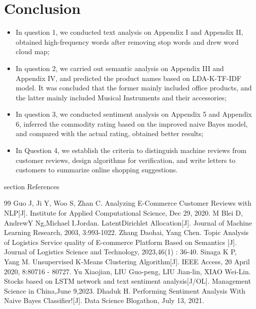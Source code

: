\documentclass[12pt]{mcmthesis}
\begin{document}
\section{Conclusion}
\begin{itemize}
	\item In question 1, we conducted text analysis on Appendix I and Appendix II, obtained high-frequency words after removing stop words and drew word cloud map;
	\item In question 2, we carried out semantic analysis on Appendix III and Appendix IV, and predicted the product names based on LDA-K-TF-IDF model. It was concluded that the former mainly included office products, and the latter mainly included Musical Instruments and their accessories;
	\item In question 3, we conducted sentiment analysis on Appendix 5 and Appendix 6, inferred the commodity rating based on the improved naive Bayes model, and compared with the actual rating, obtained better results;
	\item In Question 4, we establish the criteria to distinguish machine reviews from customer reviews, design algorithms for verification, and write letters to customers to summarize online shopping suggestions.
\end{itemize}
%
\clearpage
{} 
{} {section} {References}
\begin{thebibliography}{99}
Guo J, Ji Y, Woo S, Zhan C. Analyzing E-Commerce Customer Reviews with NLP[J]. Institute for Applied Computational Science, Dec 29, 2020.
M Blei D, AndrewY Ng,Michael I.Jordan. LatentDirichlet Allocation[J]. Journal of Machine Learning Research, 2003, 3:993-1022.
Zhang Daohai, Yang Chen. Topic Analysis of Logistics Service quality of E-commerce Platform Based on Semantics [J]. Journal of Logistics Science and Technology, 2023,46(1) : 36-40.
Sinaga K P, Yang M. Unsupervised K-Means Clustering Algorithm[J]. IEEE Access, 20 April 2020, 8:80716 - 80727.
Yu Xiaojian, LIU Guo-peng, LIU Jian-lin, XIAO Wei-Lin. Stocks based on LSTM network and text sentiment analysis[J/OL]. Management Science in China,June 9,2023.
Dhaduk H. Performing Sentiment Analysis With Naive Bayes Classifier![J]. Data Science Blogathon, July 13, 2021.
\end{thebibliography}
\end{document}
